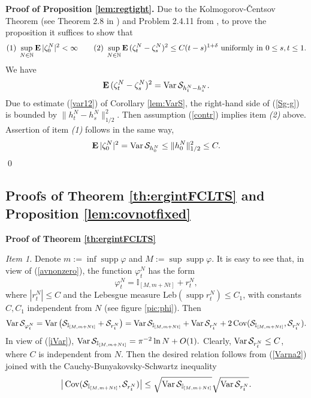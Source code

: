 \documentclass{article}
\numberwithin{equation}{section}
\newcommand{\mN}{\mathbb{N}}
\newcommand{\mI}{\mathbb{I}}
\newcommand{\SSS}{{\cal S}}
\newcommand{\ph}{\varphi}
\newcommand{\de}{\delta}
\newcommand{\supp}{\operatorname{supp}}
\newcommand{\Cov}{\operatorname{Cov}}
\newcommand{\Var}{\operatorname{Var}}
\newcommand{\ssk}{\smallskip}
\newcommand{\MO}{\mbox{\bf E}\,}
\newcommand{\qmb}{\quad\mbox}
\newcommand{\qu}{\quad}
\newcommand{\lbl}{\label}
\newcommand{\rprop}{Proposition \nolinebreak}
\newcommand{\bee}{\begin{equation}}
\newcommand{\eee}{\end{equation}}
\begin{document}
\ssk
{\bf Proof of \rprop \ref{lem:regtight}.}
Due to the Kolmogorov-\v{C}entsov Theorem (see Theorem 2.8 in \cite{KaSh})
and Problem 2.4.11 from \cite{KaSh},
to prove the proposition
it suffices to show that
$$
(1)\;
\sup\limits_{N\in\mN}\MO|\zeta^N_0|^{2}<\infty
\qquad
(2)\;
\sup\limits_{N\in\mN}\MO(\zeta_t^N -\zeta_s^N)^2 \leq C(t-s)^{1+\de}
\mbox{ uniformly in } 0\leq s,t\leq 1.
$$
We have
\bee\lbl{Sg-g}
\MO(\zeta^N_t-\zeta^N_s)^2 = \Var\SSS_{h^N_t-h^N_s}.
\eee
Due to estimate (\ref{var12}) of Corollary \nolinebreak \ref{lem:VarS},
the right-hand side of (\ref{Sg-g}) is bounded by
$\|h^N_t-h^N_s\|^2_{1/2}$.
Then assumption (\ref{contr}) implies
item {\it (2)} above.
Assertion of item {\it (1)} follows in the same way,
$$
\MO |\zeta_0^N|^2 = \Var\SSS_{h_0^N} \leq \|h^N_0\|^2_{1/2}\leq C.
$$
\qed



%
%
%
%
%
\subsection{Proofs of Theorem \ref{th:ergintFCLTS} and Proposition \ref{lem:covnotfixed}}
\lbl{sec:ergintFCLTS}

{\bf Proof of Theorem \ref{th:ergintFCLTS}}

{\it Item 1.}
Denote $m:=\inf\supp\ph$ and $M:=\sup\supp\ph$.
It is easy to see that,
in view of (\ref{avnonzero}),
the function $\ph^N_t$ has the form
$$
\ph^N_t=\mI_{[M,m+Nt]} + r^N_t,
$$
where $|r^N_t|\leq C$ and the Lebesgue measure Leb$(\supp r^N_t)\leq C_1$,
with constants $C,C_1$ independent from $N$
(see figure \ref{pic:phi}).
Then
\bee \lbl{Varna2}
\Var\SSS_{\ph^N_t}=\Var\big(\SSS_{\mI_{[M,m+Nt]}} + \SSS_{r^N_t} \big)
=\Var\SSS_{\mI_{[M,m+Nt]}} + \Var\SSS_{r^N_t} + 2 \Cov (\SSS_{\mI_{[M,m+Nt]}} ,\SSS_{r^N_t}).
\eee
In view of (\ref{iVar}),
$\Var\SSS_{\mI_{[M,m+Nt]}} = \pi^{-2}\ln N + O(1).$
Clearly,
$\Var\SSS_{r^N_t}\leq C$, where $C$ is independent from $N$.
Then the desired relation follows from (\ref{Varna2}) joined with the
Cauchy-Bunyakovsky-Schwartz inequality
$$
\big|\Cov (\SSS_{\mI_{[M,m+Nt]}} ,\SSS_{r^N_t}) \big|
\leq \sqrt{\Var\SSS_{\mI_{[M,m+Nt]}} } \sqrt{\Var\SSS_{r^N_t}}.
$$
\end{document}
